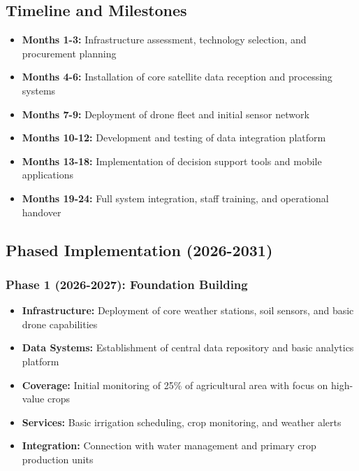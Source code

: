 \subsection{Timeline and Milestones}
\begin{itemize}
    \item \textbf{Months 1-3:} Infrastructure assessment, technology selection, and procurement planning
    \item \textbf{Months 4-6:} Installation of core satellite data reception and processing systems
    \item \textbf{Months 7-9:} Deployment of drone fleet and initial sensor network
    \item \textbf{Months 10-12:} Development and testing of data integration platform
    \item \textbf{Months 13-18:} Implementation of decision support tools and mobile applications
    \item \textbf{Months 19-24:} Full system integration, staff training, and operational handover
\end{itemize}

\subsection{Phased Implementation (2026-2031)}

\subsubsection{Phase 1 (2026-2027): Foundation Building}
\begin{itemize}
    \item \textbf{Infrastructure:} Deployment of core weather stations, soil sensors, and basic drone capabilities
    \item \textbf{Data Systems:} Establishment of central data repository and basic analytics platform
    \item \textbf{Coverage:} Initial monitoring of 25\% of agricultural area with focus on high-value crops
    \item \textbf{Services:} Basic irrigation scheduling, crop monitoring, and weather alerts
    \item \textbf{Integration:} Connection with water management and primary crop production units
\end{itemize}

